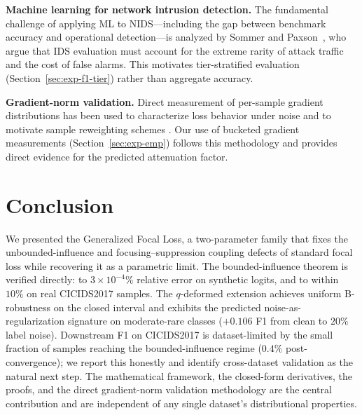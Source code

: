\documentclass[conference]{IEEEtran}
\theoremstyle{definition}
\begin{document}
\textbf{Machine learning for network intrusion detection.} The fundamental challenge of applying ML to NIDS---including the gap between benchmark accuracy and operational detection---is analyzed by Sommer and Paxson~\cite{sommer2010outside}, who argue that IDS evaluation must account for the extreme rarity of attack traffic and the cost of false alarms. This motivates tier-stratified evaluation (Section~\ref{sec:exp-f1-tier}) rather than aggregate accuracy.

\textbf{Gradient-norm validation.} Direct measurement of per-sample gradient distributions has been used to characterize loss behavior under noise \cite{ghosh2017robust} and to motivate sample reweighting schemes \cite{ren2018learning}. Our use of bucketed gradient measurements (Section~\ref{sec:exp-emp}) follows this methodology and provides direct evidence for the predicted attenuation factor.

\section{Conclusion}

We presented the Generalized Focal Loss, a two-parameter family that fixes the unbounded-influence and focusing--suppression coupling defects of standard focal loss while recovering it as a parametric limit. The bounded-influence theorem is verified directly: to $3 \times 10^{-4}\%$ relative error on synthetic logits, and to within $10\%$ on real CICIDS2017 samples. The $q$-deformed extension achieves uniform B-robustness on the closed interval and exhibits the predicted noise-as-regularization signature on moderate-rare classes ($+0.106$ F1 from clean to $20\%$ label noise). Downstream F1 on CICIDS2017 is dataset-limited by the small fraction of samples reaching the bounded-influence regime ($0.4\%$ post-convergence); we report this honestly and identify cross-dataset validation as the natural next step. The mathematical framework, the closed-form derivatives, the proofs, and the direct gradient-norm validation methodology are the central contribution and are independent of any single dataset's distributional properties.
\end{document}
